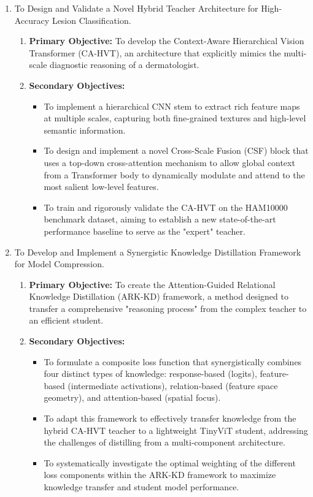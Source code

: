 \begin{enumerate}
    \item To Design and Validate a Novel Hybrid Teacher Architecture for High-Accuracy Lesion Classification.

\begin{enumerate}
    \item \textbf{Primary Objective:} To develop the Context-Aware Hierarchical Vision Transformer (CA-HVT), an architecture that explicitly mimics the multi-scale diagnostic reasoning of a dermatologist.
    \item \textbf{Secondary Objectives:}
    \begin{itemize}
        \item To implement a hierarchical CNN stem to extract rich feature maps at multiple scales, capturing both fine-grained textures and high-level semantic information.
        \item To design and implement a novel Cross-Scale Fusion (CSF) block that uses a top-down cross-attention mechanism to allow global context from a Transformer body to dynamically modulate and attend to the most salient low-level features.
        \item To train and rigorously validate the CA-HVT on the HAM10000 benchmark dataset, aiming to establish a new state-of-the-art performance baseline to serve as the "expert" teacher.
    \end{itemize}
\end{enumerate}

\item To Develop and Implement a Synergistic Knowledge Distillation Framework for Model Compression.
\begin{enumerate}
\item \textbf{Primary Objective:} To create the Attention-Guided Relational Knowledge Distillation (ARK-KD) framework, a method designed to transfer a comprehensive "reasoning process" from the complex teacher to an efficient student.
\item \textbf{Secondary Objectives:}
\begin{itemize}
    \item To formulate a composite loss function that synergistically combines four distinct types of knowledge: response-based (logits), feature-based (intermediate activations), relation-based (feature space geometry), and attention-based (spatial focus).
    \item To adapt this framework to effectively transfer knowledge from the hybrid CA-HVT teacher to a lightweight TinyViT student, addressing the challenges of distilling from a multi-component architecture.
    \item To systematically investigate the optimal weighting of the different loss components within the ARK-KD framework to maximize knowledge transfer and student model performance.
\end{itemize}
\end{enumerate}


\end{enumerate}
